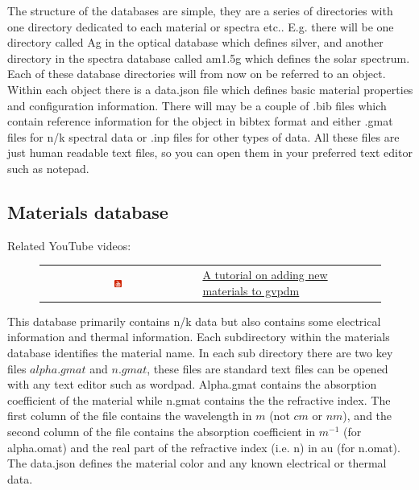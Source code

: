 The structure of the databases are simple, they are a series of directories with one directory dedicated to each material or spectra etc.. E.g. there will be one directory called Ag in the optical database which defines silver, and another directory in the spectra database called am1.5g which defines the solar spectrum.  Each of these database directories will from now on be referred to an object.  Within each object there is a data.json file which defines basic material properties and configuration information.  There will may be a couple of .bib files which contain reference information for the object in bibtex format and either .gmat files for n/k spectral data or .inp files for other types of data.  All these files are just human readable text files, so you can open them in your preferred text editor such as notepad.


\subsection{Materials database}
\label{sec:materialdatabase}
Related YouTube videos:
\begin{figure}[H]

\begin{tabular}{ c l }

\includegraphics[width=0.05\textwidth]{./images/youtube.png}

&
\href{https://www.youtube.com/watch?v=0u6_jRVhZwU}{A tutorial on adding new materials to gvpdm}

\end{tabular}
\end{figure}

This database primarily contains n/k data but also contains some electrical information and thermal information. Each subdirectory within the materials database identifies the material name.  In each sub directory there are two key files $alpha.gmat$ and $n.gmat$, these files are standard text files can be opened with any text editor such as wordpad.    Alpha.gmat contains the absorption coefficient of the material while n.gmat contains the the refractive index.  The first column of the file contains the wavelength in $m$ (not $cm$ or $nm$), and the second column of the file contains the absorption coefficient in $m^{-1}$ (for alpha.omat) and the real part of the refractive index (i.e. n) in au (for n.omat). The data.json defines the material color and any known electrical or thermal data.


